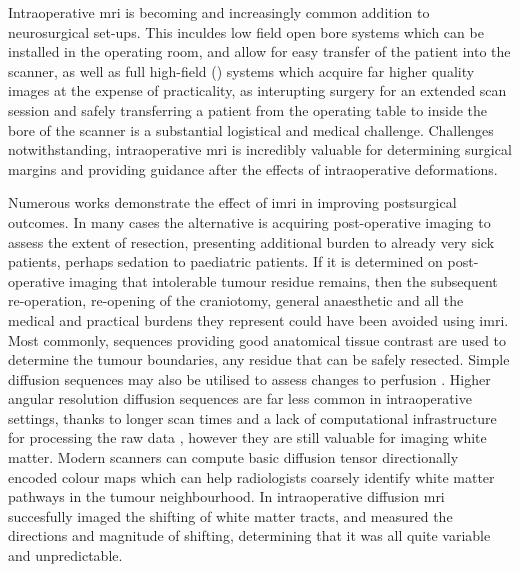 Intraoperative \gls{mri} is becoming and increasingly common addition to neurosurgical set-ups.
This inculdes low field open bore systems which can be installed in the operating room, and allow for easy transfer of the patient into the scanner, as well as full high-field () systems which acquire far higher quality images at the expense of practicality, as interupting surgery for an extended scan session and safely transferring a patient from the operating table to inside the bore of the scanner is a substantial logistical and medical challenge.
Challenges notwithstanding, intraoperative \gls{mri} is incredibly valuable for determining surgical margins and providing guidance after the effects of intraoperative deformations.

Numerous works demonstrate the effect of \gls{imri} in improving postsurgical outcomes.
In many cases the alternative is acquiring post-operative imaging to assess the extent of resection, presenting additional burden to already very sick patients, perhaps sedation to paediatric patients.
If it is determined on post-operative imaging that intolerable tumour residue remains, then the subsequent re-operation, re-opening of the craniotomy, general anaesthetic and all the medical and practical burdens they represent could have been avoided using \gls{imri}.
Most commonly, sequences providing good anatomical tissue contrast are used to determine the tumour boundaries, any residue that can be safely resected.
Simple diffusion sequences may also be utilised to assess changes to perfusion .
Higher angular resolution diffusion sequences are far less common in intraoperative settings, thanks to longer scan times and a lack of computational infrastructure for processing the raw data , however they are still valuable for imaging white matter.
Modern scanners can compute basic diffusion tensor directionally encoded colour maps which can help radiologists coarsely identify white matter pathways in the tumour neighbourhood.
In  intraoperative diffusion \gls{mri} succesfully imaged the shifting of white matter tracts, and  measured the directions and magnitude of shifting, determining that it was all quite variable and unpredictable.
